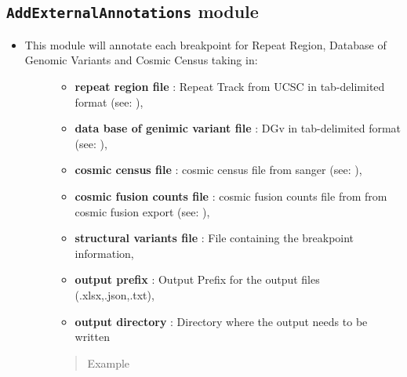 \documentclass[letterpaper,10pt,english]{sphinxmanual}
\begin{document}
\subsection{\texttt{AddExternalAnnotations} module}
\label{iAnnotateSV:addexternalannotations-module}\begin{itemize}
\item {} \begin{description}
\item[{This module will annotate each breakpoint for Repeat Region, Database of Genomic Variants and Cosmic Census taking in:}] \leavevmode\begin{itemize}
\item {} 
\textbf{repeat region file} : Repeat Track from UCSC in tab-delimited format (see: ),

\item {} 
\textbf{data base of genimic variant file} : DGv in tab-delimited format (see: ),

\item {} 
\textbf{cosmic census file} : cosmic census file from sanger (see: ),

\item {} 
\textbf{cosmic fusion counts file} : cosmic fusion counts file from from cosmic fusion export (see: ),

\item {} 
\textbf{structural variants file} : File containing the breakpoint information,

\item {} 
\textbf{output prefix} : Output Prefix for the output files (.xlsx,.json,.txt),

\item {} 
\textbf{output directory} : Directory where the output needs to be written

\end{itemize}
\begin{quote}\begin{description}
\item[{Example}] \leavevmode
{}


\end{description}\end{quote}

\end{description}

\end{itemize}
\end{document}
